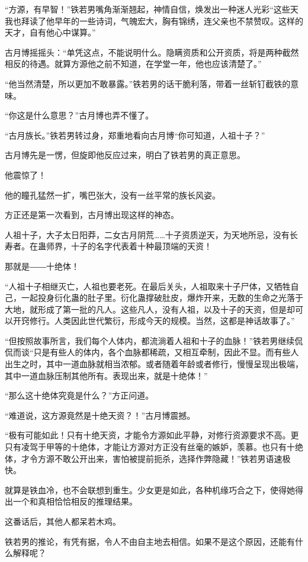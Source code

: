 \begin{this_body}
“方源，有早智！”铁若男嘴角渐渐翘起，神情自信，焕发出一种迷人光彩“这些天我也拜读了他早年的一些诗词，气魄宏大，胸有锦绣，连父亲也不禁赞叹。这样的天才，自有他心中谋算。”

古月博摇摇头：“单凭这点，不能说明什么。隐瞒资质和公开资质，将是两种截然相反的待遇。就算方源他之前不知道，在学堂一年，他也应该清楚了。”

“他当然清楚，所以更加不敢暴露。”铁若男的话干脆利落，带着一丝斩钉截铁的意味。

“你这是什么意思？”古月博也弄不懂了。

“古月族长。”铁若男转过身，郑重地看向古月博“你可知道，人祖十子？”

古月博先是一愣，但旋即他反应过来，明白了铁若男的真正意思。

他震惊了！

他的瞳孔猛然一扩，嘴巴张大，没有一丝平常的族长风姿。

方正还是第一次看到，古月博出现这样的神态。

人祖十子，大子太日阳莽，二女古月阴荒……十子资质逆天，为天地所忌，没有长寿者。在蛊师界，十子的名字代表着十种最顶端的天资！

那就是――十绝体！

“人祖十子相继灭亡，人祖也要老死。在最后关头，人祖取来十子尸体，又牺牲自己，一起投身衍化蛊的肚子里。衍化蛊撑破肚皮，爆炸开来，无数的生命之光落于大地，就形成了第一批的凡人。这些凡人，没有人祖，以及十子的天资，但是却可以开窍修行。人类因此世代繁衍，形成今天的规模。当然，这都是神话故事了。”

“但按照故事所言，我们每个人体内，都流淌着人祖和十子的血脉！”铁若男继续侃侃而谈“只是有些人的体内，各个血脉都稀疏，又相互牵制，因此不显。而有些人出生之时，其中一道血脉就相当浓郁。或者随着年龄或者修行，慢慢呈现出极端，其中一道血脉压制其他所有。表现出来，就是十绝体！”

“那么这十绝体究竟是什么？”方正问道。

“难道说，这方源竟然是十绝天资？！”古月博震撼。

“极有可能如此！只有十绝天资，才能令方源如此平静，对修行资源要求不高。更只有凌驾于甲等的十绝体，才能让方源对方正没有丝毫的嫉妒，羡慕。也只有十绝体，才令方源不敢公开出来，害怕被提前扼杀，选择作弊隐藏！”铁若男语速极快。

就算是铁血冷，也不会联想到重生。少女更是如此，各种机缘巧合之下，使得她得出一个和真相恰恰相反的推理结果。

这番话后，其他人都呆若木鸡。

铁若男的推论，有凭有据，令人不由自主地去相信。如果不是这个原因，还能有什么解释呢？


\end{this_body}
